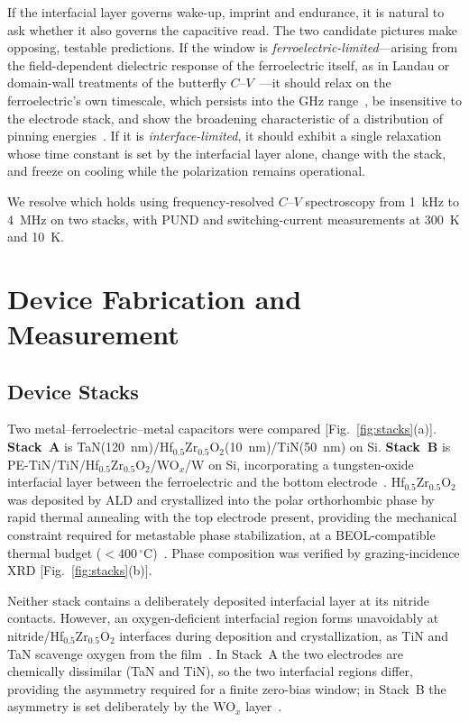 \documentclass[journal]{IEEEtran}
\newcommand{\hzo}{Hf$_{0.5}$Zr$_{0.5}$O$_{2}$}
\begin{document}
If the interfacial layer governs wake-up, imprint and endurance, it is
natural to ask whether it also governs the capacitive read. The two candidate
pictures make opposing, testable predictions. If the window is
\emph{ferroelectric-limited}---arising from the field-dependent dielectric
response of the ferroelectric itself, as in Landau or domain-wall treatments
of the butterfly $C$--$V$~\cite{lee2025aem,tagantsev2002,segantini2022ti}---it
should relax on the ferroelectric's own timescale, which persists into the
GHz range~\cite{kim2023impedance}, be insensitive to the electrode stack, and
show the broadening characteristic of a distribution of pinning
energies~\cite{jonscher1977,jonscher1983}. If it is
\emph{interface-limited}, it should exhibit a single relaxation whose time
constant is set by the interfacial layer alone, change with the stack, and
freeze on cooling while the polarization remains operational.

We resolve which holds using frequency-resolved $C$--$V$ spectroscopy from
1~kHz to 4~MHz on two stacks, with PUND and switching-current measurements at
300~K and 10~K.

\section{Device Fabrication and Measurement}

\subsection{Device Stacks}
Two metal--ferroelectric--metal capacitors were compared
[Fig.~\ref{fig:stacks}(a)]. \textbf{Stack~A} is
TaN(120~nm)/\hzo{}(10~nm)/TiN(50~nm) on Si. \textbf{Stack~B} is
PE-TiN/TiN/\hzo{}/WO$_x$/W on Si, incorporating a tungsten-oxide interfacial
layer between the ferroelectric and the bottom electrode~\cite{paul2026wox}.
\hzo{} was deposited by ALD and crystallized into the polar orthorhombic
phase by rapid thermal annealing with the top electrode present, providing
the mechanical constraint required for metastable phase stabilization, at a
BEOL-compatible thermal budget ($<400\,^\circ$C)~\cite{cho2024beol}. Phase
composition was verified by grazing-incidence XRD [Fig.~\ref{fig:stacks}(b)].

Neither stack contains a deliberately deposited interfacial layer at its
nitride contacts. However, an oxygen-deficient interfacial region forms
unavoidably at nitride/\hzo{} interfaces during deposition and
crystallization, as TiN and TaN scavenge oxygen from the
film~\cite{kim2023vacancy,segantini2023strain,koroleva2022,alcala2023}. In
Stack~A the two electrodes are chemically dissimilar (TaN and TiN), so the two
interfacial regions differ, providing the asymmetry required for a finite
zero-bias window; in Stack~B the asymmetry is set deliberately by the WO$_x$
layer~\cite{paul2026wox}.
\end{document}
